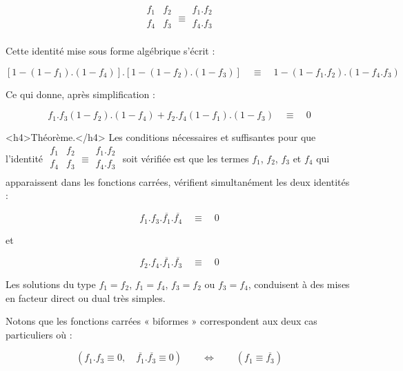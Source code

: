 \[
\begin{array}{|c|c|} f_1 & f_2 \\f_4 & f_3 \\      \end{array} \equiv \begin{array}{|c|} f_1 . f_2 \\ f_4 . f_3 \\ \end{array} 
\]



Cette identité mise sous forme algébrique s'écrit : 



\[
\left[ 1 - (1 -f_1) . (1 - f_4) \right] . \left[ 1 - (1 -f_2) . (1- f_3)\right] \quad  \equiv \quad 1 -(1-f_1 . f_2) . (1 - f_4 . f_3)
\]



Ce qui donne, après simplification : 



\[
f_1 . f_3 (1-f_2) . (1-f_4) + f_2 . f_4 (1 -f_1) . (1-f_3) \quad  \equiv \quad  0 
\]




<h4>Théorème.</h4> Les conditions nécessaires et suffisantes pour que l'identité $\begin{array}{|c|c|} f_1 & f_2 \\f_4 & f_3 \\      \end{array} \equiv \begin{array}{|c|} f_1 . f_2 \\ f_4 . f_3 \\ \end{array} $ soit vérifiée est que les termes 
 $f_1$, $f_2$, $f_3$ et $f_4$ qui apparaissent dans les fonctions carrées, vérifient simultanément les deux identités : 
 
\[ f_1 . f_3 . \overline{f_1} . \overline{f_4} \quad  \equiv \quad 0 \] 

et  

\[ f_2 . f_4 . \overline{f_1} . \overline{f_3} \quad  \equiv \quad 0 \] 



Les solutions du type $f_1 = f_2$, $f_1=f_4$, $f_3 = f_2$ ou $f_3 = f_4$, conduisent à des mises en facteur direct ou dual très simples. 

Notons que les fonctions carrées « biformes » correspondent aux deux cas particuliers où : 

\[ ( f_1 . f_3 \equiv 0, \quad \overline{f_1} . \overline{f_3} \equiv 0 ) \qquad   \Longleftrightarrow \qquad (f_1  \equiv \overline{f_3}) \]


